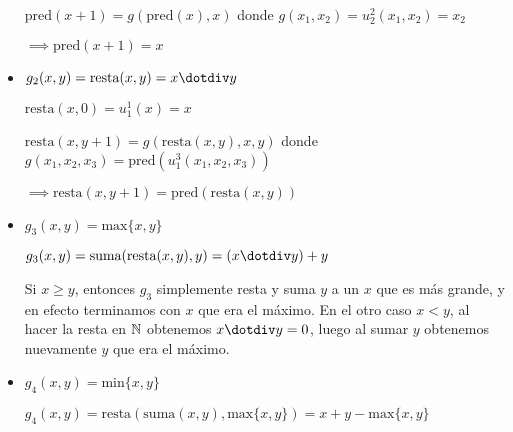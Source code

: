 \begin{itemize}
    $\text{pred}(x + 1) = g(\text{pred}(x), x)$ donde $g(x_1, x_2) = u^2_2(x_1, x_2) = x_2$

    $\implies \text{pred}(x + 1) = x$

    \item
    $g_2(x, y) = \text{resta}(x, y) = x \dotdiv y$

    $\text{resta}(x, 0) = u^1_1(x) = x$

    $\text{resta}(x, y + 1) = g(\text{resta}(x, y), x, y)$ donde $g(x_1, x_2, x_3) = \text{pred}(u^3_1(x_1, x_2, x_3))$

    $\implies \text{resta}(x, y + 1) = \text{pred}(\text{resta}(x, y))$

    \item
    $g_3(x, y) = \text{max}\{x, y\}$

    $g_3(x, y) = \text{suma}(\text{resta}(x, y), y) = (x \dotdiv y) + y$

    Si $x \geq y$, entonces $g_3$ simplemente resta y suma $y$ a un $x$ que es más grande, y en efecto terminamos con $x$ que era el máximo. En el otro caso $x < y$, al hacer la resta en $\mathbb{N}$ obtenemos $x \dotdiv y = 0$, luego al sumar $y$ obtenemos nuevamente $y$ que era el máximo.

    \item
    $g_4(x, y) = \text{min}\{x, y\}$

    $g_4(x, y) = \text{resta}(\text{suma}(x, y), \text{max}\{x, y\}) = x + y - \text{max}\{x, y\}$
\end{itemize}
